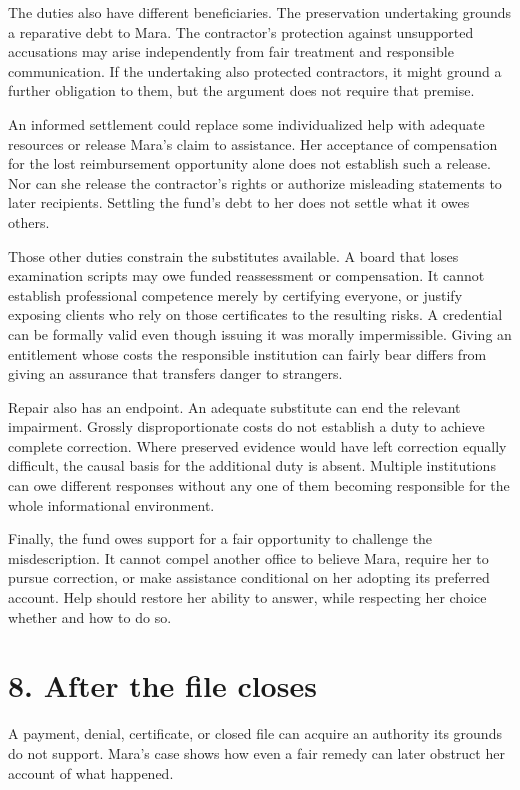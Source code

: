 The duties also have different beneficiaries. The preservation undertaking grounds a reparative debt to Mara. The contractor’s protection against unsupported accusations may arise independently from fair treatment and responsible communication. If the undertaking also protected contractors, it might ground a further obligation to them, but the argument does not require that premise.

An informed settlement could replace some individualized help with adequate resources or release Mara’s claim to assistance. Her acceptance of compensation for the lost reimbursement opportunity alone does not establish such a release. Nor can she release the contractor’s rights or authorize misleading statements to later recipients. Settling the fund’s debt to her does not settle what it owes others.

Those other duties constrain the substitutes available. A board that loses examination scripts may owe funded reassessment or compensation. It cannot establish professional competence merely by certifying everyone, or justify exposing clients who rely on those certificates to the resulting risks. A credential can be formally valid even though issuing it was morally impermissible. Giving an entitlement whose costs the responsible institution can fairly bear differs from giving an assurance that transfers danger to strangers.

Repair also has an endpoint. An adequate substitute can end the relevant impairment. Grossly disproportionate costs do not establish a duty to achieve complete correction. Where preserved evidence would have left correction equally difficult, the causal basis for the additional duty is absent. Multiple institutions can owe different responses without any one of them becoming responsible for the whole informational environment.

Finally, the fund owes support for a fair opportunity to challenge the misdescription. It cannot compel another office to believe Mara, require her to pursue correction, or make assistance conditional on her adopting its preferred account. Help should restore her ability to answer, while respecting her choice whether and how to do so.

\section*{8. After the file closes}

A payment, denial, certificate, or closed file can acquire an authority its grounds do not support. Mara’s case shows how even a fair remedy can later obstruct her account of what happened.

